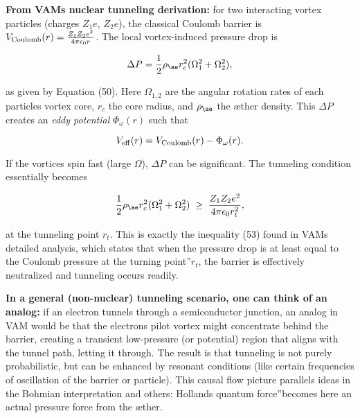 \documentclass[a4paper, aps,preprint,superscriptaddress, 12pt]{revtex4}
\begin{document}
\textbf{From VAM\rqs s nuclear tunneling derivation:} for two interacting vortex particles (charges $Z_1e$, $Z_2e$), the classical Coulomb barrier is $V_{\rm Coulomb}(r) = \frac{Z_1 Z_2 e^2}{4\pi\epsilon_0 r}$. The local vortex-induced pressure drop is

\begin{equation}
    \Delta P = \frac{1}{2}\rho_{\ae} r_c^2 (\Omega_1^2 + \Omega_2^2),
\end{equation}

as given by Equation (50). Here $\Omega_{1,2}$ are the angular rotation rates of each particle\rqs s vortex core, $r_c$ the core radius, and $\rho_{\ae}$ the æther density. This $\Delta P$ creates an \textit{eddy potential} $\Phi_\omega(r)$ such that

\begin{equation}
    V_{\rm eff}(r) = V_{\rm Coulomb}(r) - \Phi_\omega(r).
\end{equation}

If the vortices spin fast (large $\Omega$), $\Delta P$ can be significant. The tunneling condition essentially becomes

\begin{equation}
    \frac{1}{2}\rho_{\ae} r_c^2 (\Omega_1^2 + \Omega_2^2) \;\ge\; \frac{Z_1 Z_2 e^2}{4\pi\epsilon_0 r_t^2},
\end{equation}

at the tunneling point $r_t$. This is exactly the inequality (53) found in VAM\rqs s detailed analysis, which states that when the pressure drop is at least equal to the Coulomb pressure at the \grqq turning point\textquotedblright $r_t$, the barrier is effectively neutralized and tunneling occurs readily.


\textbf{In a general (non-nuclear) tunneling scenario, one can think of an analog:} if an electron tunnels through a semiconductor junction, an analog in VAM would be that the electron\rqs s pilot vortex might concentrate behind the barrier, creating a transient low-pressure (or potential) region that aligns with the tunnel path, letting it through. The result is that tunneling is not purely probabilistic, but can be enhanced by resonant conditions (like certain frequencies of oscillation of the barrier or particle). This causal flow picture parallels ideas in the Bohmian interpretation and others: Holland\rqs s \grqq quantum force\textquotedblright becomes here an actual pressure force from the æther.
\end{document}
